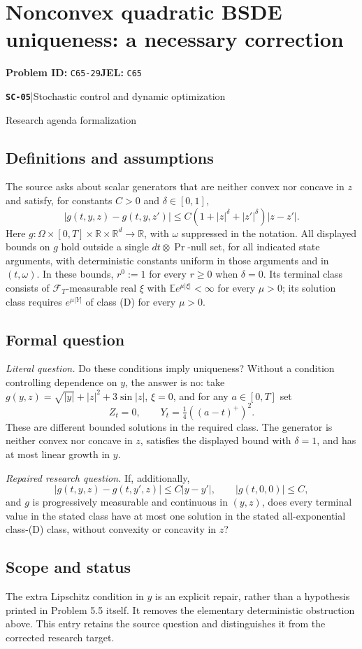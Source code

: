 \documentclass[11pt,a4paper]{article}
\newcommand{\R}{\mathbb R}
\newcommand{\E}{\mathbb E}
\newcommand{\entrymeta}[3]{{\sffamily\small\color{muted}\textbf{\texttt{#1}}\quad|\quad #2\par #3\par}}
\begin{document}
\section*{Nonconvex quadratic BSDE uniqueness: a necessary correction}
\textbf{Problem ID:} \texttt{C65-29}\quad \textbf{JEL:} \texttt{C65}\par
\label{problem:OP-0566}
\label{beyond:SC-05}
\entrymeta{SC-05}{Stochastic control and dynamic optimization}{Research agenda formalization}
\subsection*{Definitions and assumptions}
The source asks about scalar generators that are neither convex nor
concave in $z$ and satisfy, for constants $C>0$ and $\delta\in[0,1]$,
\[
 |g(t,y,z)-g(t,y,z')|
 \leq C(1+|z|^\delta+|z'|^\delta)|z-z'|.
\]
Here $g:\Omega\times[0,T]\times\R\times\R^d\to\R$, with
$\omega$ suppressed in the notation. All displayed bounds on $g$ hold
outside a single $dt\otimes\Pr$-null set, for all indicated state
arguments, with deterministic constants uniform in those arguments and
in $(t,\omega)$. In these bounds, $r^0:=1$ for every $r\geq0$ when
$\delta=0$.
Its terminal class consists of $\mathcal F_T$-measurable real $\xi$ with
$\E e^{\mu|\xi|}<\infty$ for every $\mu>0$;
its solution class requires $e^{\mu|Y|}$ of class (D) for every $\mu>0$.
\subsection*{Formal question}
\emph{Literal question.} Do these conditions imply uniqueness?
Without a condition controlling dependence on $y$, the answer is no:
take $g(y,z)=\sqrt{|y|}+|z|^2+3\sin|z|$, $\xi=0$, and for any $a\in[0,T]$ set
\[
 Z_t=0,\qquad Y_t=\tfrac14((a-t)^+)^2.
\]
These are different bounded solutions in the required class. The generator
is neither convex nor concave in $z$, satisfies the displayed bound with
$\delta=1$, and has at most linear growth in $y$.

\emph{Repaired research question.} If, additionally,
\[
 |g(t,y,z)-g(t,y',z)|\leq C|y-y'|,
 \qquad |g(t,0,0)|\leq C,
\]
and $g$ is progressively measurable and continuous in $(y,z)$,
does every terminal value in the stated class have at most one solution
in the stated all-exponential class-(D) class, without convexity or
concavity in $z$?
\subsection*{Scope and status}
The extra Lipschitz condition in $y$ is an explicit repair, rather than
a hypothesis printed in Problem 5.5 itself. It removes the elementary
deterministic obstruction above. This entry retains the source question
and distinguishes it from the corrected research target.
\end{document}
